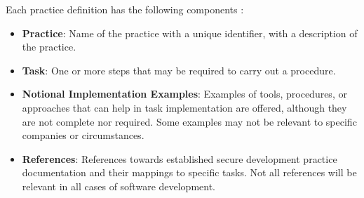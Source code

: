 Each practice definition has the following components \cite{ssdf}:
\begin{itemize}
  \item \textbf{Practice}: Name of the practice with a unique identifier, with a description of the practice. 
  \item \textbf{Task}: One or more steps that may be required to carry out a procedure.
  \item \textbf{Notional Implementation Examples}: Examples of tools, procedures, or approaches that can help in task implementation are offered, although they are not complete nor required. Some examples may not be relevant to specific companies or circumstances.
  \item \textbf{References}: References towards established secure development practice documentation and their mappings to specific tasks. Not all references will be relevant in all cases of software development. 
\end{itemize}



